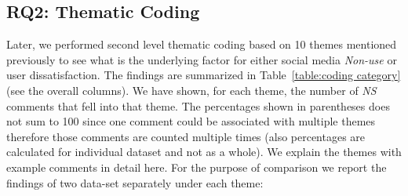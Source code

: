 \subsection{RQ2: Thematic Coding}
 Later, we performed second level thematic coding based on 10 themes mentioned previously to see what is the underlying factor for either social media \textit{Non-use} or user dissatisfaction. The findings are summarized in Table~\ref{table:coding category} (see the overall columns). We have shown, for each theme, the number of \emph{NS} comments that fell into that theme. The percentages shown in parentheses does not sum to 100 since one comment could be associated with multiple themes therefore those comments are counted multiple times (also percentages are calculated for individual dataset and not as a whole). We explain the themes with example comments in detail here. For the purpose of comparison we report the findings of two data-set separately under each theme:
 
